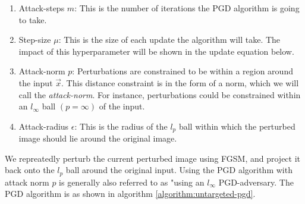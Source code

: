 \documentclass[12pt, oneside]{book}
\begin{document}
\begin{enumerate}
    \item Attack-steps $m$: This is the number of iterations the PGD algorithm
    is going to take.
    \item Step-size $\mu$: This is the size of each update the algorithm will
    take. The impact of this hyperparameter will be shown in the update equation
    below.
    \item Attack-norm $p$: Perturbations are constrained to be within a region
    around the input $\vec{x}$. This distance constraint is in the form of a
    norm, which we will call the \emph{attack-norm}. For instance, perturbations
    could be constrained within an $l_\infty$ ball $(p=\infty)$ of the input.
    \item Attack-radius $\epsilon$: This is the radius of the $l_p$ ball within
    which the perturbed image should lie around the original image.
\end{enumerate}
We repreatedly perturb the current perturbed image using FGSM, and project it
back onto the $l_p$ ball around the original input. Using the PGD algorithm with
attack norm $p$ is generally also referred to as "using an $l_\infty$
PGD-adversary. The PGD algorithm is as shown in algorithm
\ref{algorithm:untargeted-pgd}.
\end{document}
